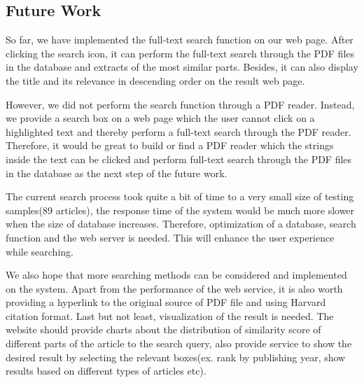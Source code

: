 
\subsection{Future Work}
So far, we have implemented the full-text search function on our web page. 
After clicking the search icon, it can perform the full-text search through the PDF files in the database and extracts of the most similar parts. 
Besides, it can also display the title and its relevance in descending order on the result web page.

However, we did not perform the search function through a PDF reader.
Instead, we provide a search box on a web page which the user cannot click on a highlighted text and thereby perform a full-text search through the PDF reader. 
Therefore, it would be great to build or find a PDF reader which the strings inside the text can be clicked and perform full-text search through the PDF files in the database as the next step of the future work.
 
The current search process took quite a bit of time to a very small size of testing samples(89 articles), the response time of the system would be much more slower when the size of database increases. 
Therefore, optimization of a database, search function and the web server is needed. 
This will enhance the user experience while searching.
 
We also hope that more searching methods can be considered and implemented on the system. 
Apart from the performance of the web service, it is also worth providing a hyperlink to the original source of PDF file and using Harvard citation format.
Last but not least, visualization of the result is needed. The website should provide charts about the distribution of similarity score of different parts of the article to the search query, also provide service to show the desired result by selecting the relevant boxes(ex. rank by publishing year, show results based on different types of articles etc).